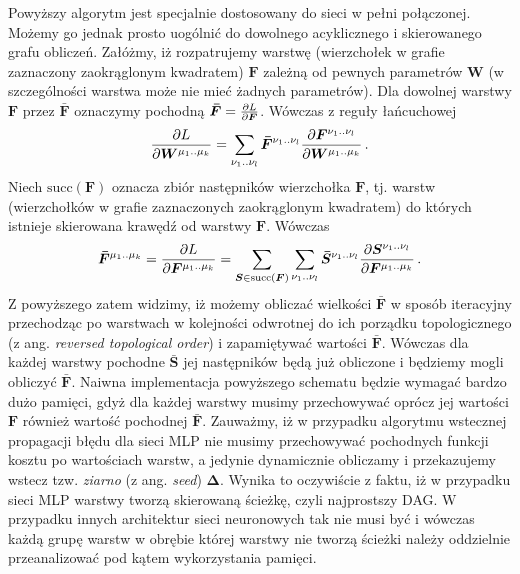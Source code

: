 \documentclass{myclass}
\numberwithin{equation}{subsection}
\begin{document}
Powyższy algorytm jest specjalnie dostosowany do sieci w pełni połączonej. Możemy go jednak prosto
uogólnić do dowolnego acyklicznego i skierowanego grafu obliczeń. Załóżmy, iż rozpatrujemy warstwę
(wierzchołek w grafie zaznaczony zaokrąglonym kwadratem) \(\bm{F}\) zależną od pewnych parametrów
\(\bm{W}\) (w szczególności warstwa może nie mieć żadnych parametrów). Dla dowolnej warstwy
\(\bm{F}\) przez \({\bm{\bar{F}}}\) oznaczymy pochodną \({\bm{\bar{F}}} = \pdv{L}{\bm{F}}\). Wówczas z
reguły łańcuchowej
\[
\pdv{L}{\bm{W}^{\mu_1..\mu_k}} = \sum_{\nu_1..\nu_l} {\bm{\bar{F}}}^{\nu_1..\nu_l} \pdv{\bm{F}^{\nu_1..\nu_l}}{\bm{W}^{\mu_1..\mu_k}}\,.
\]
Niech \(\mathrm{succ}(\bm{F})\) oznacza zbiór następników wierzchołka \(\bm{F}\), tj. warstw
(wierzchołków w grafie zaznaczonych zaokrąglonym kwadratem) do których istnieje skierowana krawędź
od warstwy \(\bm{F}\). Wówczas
\[
\bm{\bar{F}}^{\mu_1..\mu_k} = \pdv{L}{\bm{F}^{\mu_1..\mu_k}} = \sum_{\bm{S} \in \mathrm{succ}(\bm{F})} \sum_{\nu_1..\nu_l} \bm{\bar{S}}^{\nu_1..\nu_l} \pdv{\bm{S}^{\nu_1..\nu_l}}{\bm{F}^{\mu_1..\mu_k}}\,.
\]
Z powyższego zatem widzimy, iż możemy obliczać wielkości \(\bm{\bar{F}}\) w sposób iteracyjny
przechodząc po warstwach w kolejności odwrotnej do ich porządku topologicznego (z ang.
\textit{reversed topological order}) i zapamiętywać wartości \({\bm{\bar{F}}}\). Wówczas dla każdej
warstwy pochodne \(\bm{\bar{S}}\) jej następników będą już obliczone i będziemy mogli obliczyć
\({\bm{\bar{F}}}\). Naiwna implementacja powyższego schematu będzie wymagać bardzo dużo pamięci, gdyż
dla każdej warstwy musimy przechowywać oprócz jej wartości \(\bm{F}\) również wartość pochodnej
\({\bm{\bar{F}}}\). Zauważmy, iż w przypadku algorytmu wstecznej propagacji błędu dla sieci MLP nie
musimy przechowywać pochodnych funkcji kosztu po wartościach warstw, a jedynie dynamicznie obliczamy
i przekazujemy wstecz tzw. \emph{ziarno} (z ang. \textit{seed}) \(\bm{\Delta}\). Wynika to
oczywiście z faktu, iż w przypadku sieci MLP warstwy tworzą skierowaną ścieżkę, czyli najprostszy
DAG. W przypadku innych architektur sieci neuronowych tak nie musi być i wówczas każdą grupę warstw
w obrębie której warstwy nie tworzą ścieżki należy oddzielnie przeanalizować pod kątem wykorzystania
pamięci.
\end{document}
